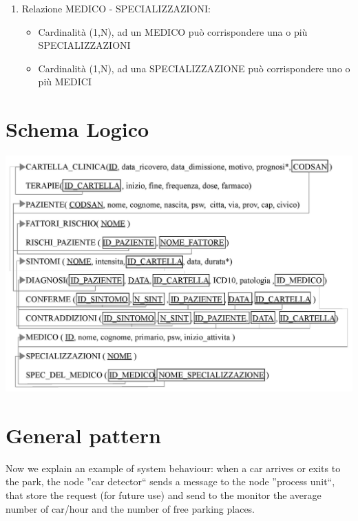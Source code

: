 \documentclass[a4paper,titlepage]{article}
\begin{document}
\begin{enumerate}
\item Relazione MEDICO - SPECIALIZZAZIONI:

\begin{itemize}[leftmargin=0.5cm, topsep=0.5cm, itemsep=0.2cm]

\item Cardinalità (1,N), ad un MEDICO può corrispondere una o più SPECIALIZZAZIONI
\item Cardinalità (1,N), ad una SPECIALIZZAZIONE può corrispondere uno o più MEDICI

\end{itemize}

\end{enumerate}

\newpage
\part{Schema Logico}
    \begin{center}

    \centering
    \includegraphics[scale=0.9]{schema_logico.jpg}

    \end{center}

\newpage
\part{General pattern}

Now we explain an example of system behaviour: when a car arrives or exits to the park, the node ''car detector`` sends a message to the node ''process unit``, that store the request (for future use) and send to the monitor the average number of car/hour and the number of free parking places.
\end{document}
